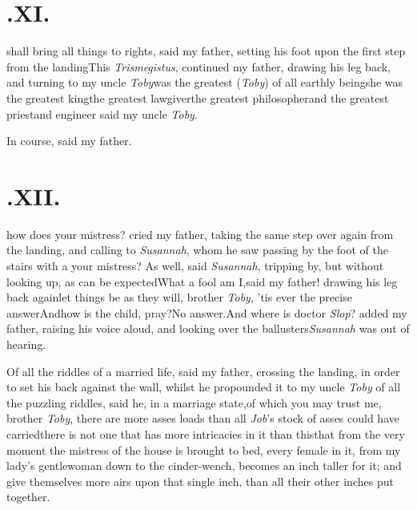 \documentclass{article}
\begin{document}
\newpage
\null\smallskip
\section{.\enspace XI.}

 shall bring all things to rights, said my father, setting his foot upon
the first step from the landing\tsh This \textit{Trismegistus}, continued my father,
drawing his leg back, and turning to my uncle \textit{Toby}\tsk was the greatest
(\textit{Toby}) of all earthly beings\tsk he was the greatest king\tsk the greatest
lawgiver\tsk the greatest philosopher\tsk and the greatest
priest\tsh and engineer\tsk
said my uncle \textit{Toby}.\tsk

\tsk In course, said my father.

\vfill


\newpage
\section{.\enspace XII.}

 how does your mistress?\break
cried my father, taking the\break
same step over again from the landing, and calling to
\textit{Susannah}, whom he saw passing by the foot of the
stairs with a 
your mistress? As well, said \textit{Susannah}, tripping by, but
without looking up, as can be expected\tsk What a fool am
I,\break said my father! drawing his leg back again\tsk let things
be as they will, brother \textit{Toby}, ’tis ever the
precise answer\tsk And\break how is the child, pray?\tsk No
answer.\break And where is doctor \textit{Slop}?  added my
father, raising his voice aloud, and looking over the
ballusters\tsk \textit{Susannah} was out of hearing.

Of all the riddles of a married life, said my father,
crossing the landing, in order
to set his back against the wall, whilst he propounded it to my uncle \textit{Toby}
\tsk of all the puzzling riddles, said he, in a marriage state,\tsk of which you may
trust me, brother \textit{Toby}, there are more asses loads than all \textit{Job}’s
stock of asses could have carried\tsk there is not one that has more intricacies in
it than this\tsk that from the very moment the mistress of the house is brought to
bed, every female in it, from my lady’s gentlewoman down to the cinder-wench,
becomes an inch taller for it; and give themselves more airs upon that single inch,
than all their other inches put together.
\end{document}
